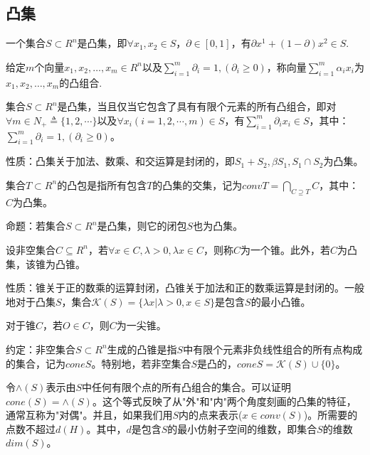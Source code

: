     \subsection{凸集}
        \begin{definition}[凸集]
        一个集合$S\subset R^n$是凸集，即$\forall x_1,x_2\in S$，$\partial \in [0,1]$，有$\partial x^1+(1-\partial)x^2\in S$.
        \end{definition}
        \begin{definition}[凸组合]
        给定$m$个向量$x_1,x_2,\ldots,x_m \in R^n$以及$\mathop{\sum}\limits_{i=1}^{m}{\partial}_i=1,({\partial}_i \geqslant 0)$，称向量$\mathop{\sum}\limits_{i=1}^{m}{\alpha}_ix_i$为$x_1,x_2,\ldots,x_m$的凸组合.
        \end{definition}
        \begin{theorem}
        集合$S\subset R^n$是凸集，当且仅当它包含了具有有限个元素的所有凸组合，即对
        $\forall m \in {N}_+\triangleq\{1,2,\cdots\}$以及$\forall x_i(i=1,2,\cdots,m)\in S$，有$\mathop{\sum}\limits_{i=1}^{m}{\partial}_ix_i \in S$，其中：$\mathop{\sum}\limits_{i=1}^{m}{\partial}_i=1,({\partial}_i \geqslant 0)$。
        \end{theorem}
        \par
        性质：凸集关于加法、数乘、和交运算是封闭的，即$S_1+S_2,\beta S_1,S_1\cap S_2$为凸集。
        \begin{definition}[凸包]
        集合$T \subset R^n$的凸包是指所有包含$T$的凸集的交集，记为$convT = \mathop{\bigcap}\limits_{C\supseteq T}C$，其中：$C$为凸集。
        \end{definition}
        \par
        命题：若集合$S\subset R^n$是凸集，则它的闭包$S$也为凸集。
        \begin{definition}[凸锥]
        设非空集合$C \subseteq R^n$，若$\forall x \in C,\lambda >0,\lambda x \in C$，则称$C$为一个锥。此外，若$C$为凸集，该锥为凸锥。
        \end{definition}
        \par
        性质：锥关于正的数乘的运算封闭，凸锥关于加法和正的数乘运算是封闭的。一般地对于凸集$S$，集合${\mathcal{K}}(S)=\{\lambda x|\lambda >0,x\in S\}$是包含$S$的最小凸锥。
        \begin{definition}[尖锥]
        对于锥$C $，若$O \in C$，则$C$为一尖锥。
        \end{definition}
        \par
        约定：非空集合$S\subset R^n$生成的凸锥是指$S$中有限个元素非负线性组合的所有点构成的集合，记为$cone S$。特别地，若非空集合$S$是凸的，$cone S={\mathcal{K}}(S)\cup \{0\}$。
        \par
        令$\wedge(S)$表示由$S$中任何有限个点的所有凸组合的集合。可以证明$cone (S)=\wedge(S)$。这个等式反映了从"外"和"内"两个角度刻画的凸集的特征，通常互称为"对偶"。并且，如果我们用$S$内的点来表示($x\in conv(S)$)。所需要的点数不超过$d(H)$。其中，$d$是包含$S$的最小仿射子空间的维数，即集合$S$的维数$dim(S)$。
